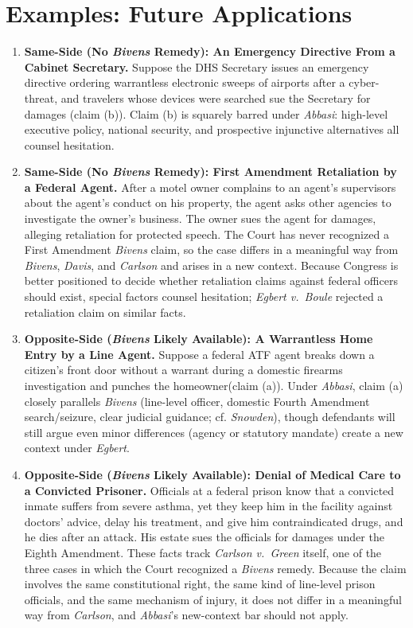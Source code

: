 \documentclass[12pt]{article}
\begin{document}
\section{Examples: Future Applications}
\begin{enumerate}

\item \textbf{Same-Side (No \textit{Bivens} Remedy): An Emergency Directive From a Cabinet Secretary.} Suppose the DHS Secretary issues an emergency directive ordering warrantless electronic sweeps of airports after a cyber-threat, and travelers whose devices were searched sue the Secretary for damages (claim (b)). Claim (b) is squarely barred under \textit{Abbasi}: high-level executive policy, national security, and prospective injunctive alternatives all counsel hesitation.

\item \textbf{Same-Side (No \textit{Bivens} Remedy): First Amendment Retaliation by a Federal Agent.} After a motel owner complains to an agent's supervisors about the agent's conduct on his property, the agent asks other agencies to investigate the owner's business. The owner sues the agent for damages, alleging retaliation for protected speech. The Court has never recognized a First Amendment \textit{Bivens} claim, so the case differs in a meaningful way from \textit{Bivens}, \textit{Davis}, and \textit{Carlson} and arises in a new context. Because Congress is better positioned to decide whether retaliation claims against federal officers should exist, special factors counsel hesitation; \textit{Egbert v.\ Boule} rejected a retaliation claim on similar facts.

\item \textbf{Opposite-Side (\textit{Bivens} Likely Available): A Warrantless Home Entry by a Line Agent.} Suppose a federal ATF agent breaks down a citizen's front door without a warrant during a domestic firearms investigation and punches the homeowner(claim (a)). Under \textit{Abbasi}, claim (a) closely parallels \textit{Bivens} (line-level officer, domestic Fourth Amendment search/seizure, clear judicial guidance; cf. \textit{Snowden}), though defendants will still argue even minor differences (agency or statutory mandate) create a new context under \textit{Egbert}.

\item \textbf{Opposite-Side (\textit{Bivens} Likely Available): Denial of Medical Care to a Convicted Prisoner.} Officials at a federal prison know that a convicted inmate suffers from severe asthma, yet they keep him in the facility against doctors' advice, delay his treatment, and give him contraindicated drugs, and he dies after an attack. His estate sues the officials for damages under the Eighth Amendment. These facts track \textit{Carlson v.\ Green} itself, one of the three cases in which the Court recognized a \textit{Bivens} remedy. Because the claim involves the same constitutional right, the same kind of line-level prison officials, and the same mechanism of injury, it does not differ in a meaningful way from \textit{Carlson}, and \textit{Abbasi}'s new-context bar should not apply.


\end{enumerate}
\end{document}

